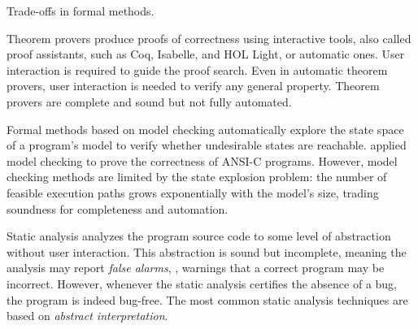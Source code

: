 \begin{marginfigure}
  \caption{Trade-offs in formal methods.}
\end{marginfigure}

Theorem provers produce proofs of correctness using interactive tools, also called proof assistants, such as Coq, Isabelle, and HOL Light, or automatic ones.
User interaction is required to guide the proof search.
Even in automatic theorem provers, user interaction is needed to verify any general property.
Theorem provers are complete and sound but not fully automated.

Formal methods based on model checking automatically explore the state space of a program's model to verify whether undesirable states are reachable.
 applied model checking to prove the correctness of ANSI-C programs.
However, model checking methods are limited by the state explosion problem: the number of feasible execution paths grows exponentially with the model's size, trading soundness for completeness and automation.

Static analysis analyzes the program source code to some level of abstraction without user interaction.
This abstraction is sound but incomplete, meaning the analysis may report \emph{false alarms}, \ie, warnings that a correct program may be incorrect.
However, whenever the static analysis certifies the absence of a bug, the program is indeed bug-free.
The most common static analysis techniques are based on \emph{abstract interpretation}.

